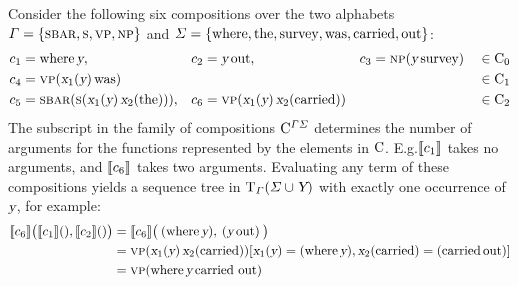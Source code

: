 \documentclass[../../document.tex]{subfiles}
\begin{document}
    \begin{example}\label{ex:dcp:comp}
        Consider the following six  compositions over the two alphabets \(\varGamma = \{ \textsc{sbar}, \textsc{s}, \textsc{vp}, \textsc{np} \}\) and \(\varSigma = \{\text{where}, \text{the}, \text{survey}, \text{was}, \text{carried}, \text{out}\}\):
        \begin{align*}
            c_1 &= \text{where} \, \textsl{y},
            &c_2 &= \textsl{y} \, \text{out},
            &c_3 &= \textsc{np} (\textsl{y} \, \text{survey}) && \in \mathrm{C}_0\\
            c_4 &= \textsc{vp}(\textsl{x}_1(\textsl{y}) \, \text{was}) && && && \in \mathrm{C}_1 \\
            c_5 &= \textsc{sbar} (\textsc{s} (\textsl{x}_1(\textsl{y}) \, \textsl{x}_2(\text{the}))),
            &c_6 &= \textsc{vp}(\textsl{x}_1(\textsl{y}) \, \textsl{x}_2(\text{carried})) && && \in \mathrm{C}_2
        \end{align*}
        The subscript in the family of  compositions \(\mathrm{C}^{\varGamma\varSigma}\) determines the number of arguments for the functions represented by the elements in \(\mathrm{C}\).
        E.g.\@ \(\llbracket c_1\rrbracket\) takes no arguments, and \(\llbracket c_6\rrbracket\) takes two arguments.
        Evaluating any term of these compositions yields a sequence tree in \(\operatorname{T}_\varGamma(\varSigma \cup \textsl{Y})\) with exactly one occurrence of \(\textsl{y}\), for example:
        \begin{align*}
            \llbracket c_6\rrbracket \big( \llbracket c_1\rrbracket(), \llbracket c_2\rrbracket() \big)
            &= \llbracket c_6\rrbracket \big( \: (\text{where} \, \textsl{y}), \: (\textsl{y} \, \text{out}) \: \big) \\
            &= \textsc{vp}(\textsl{x}_1(\textsl{y}) \, \textsl{x}_2(\text{carried}))[\textsl{x}_1(\textsl{y})=(\text{where} \, \textsl{y}), \textsl{x}_2(\text{carried})=(\text{carried}\, \text{out})] \\
            &= \textsc{vp}(\text{where} \, \textsl{y} \, \text{carried out})
        \end{align*}
    \end{example}
\end{document}
